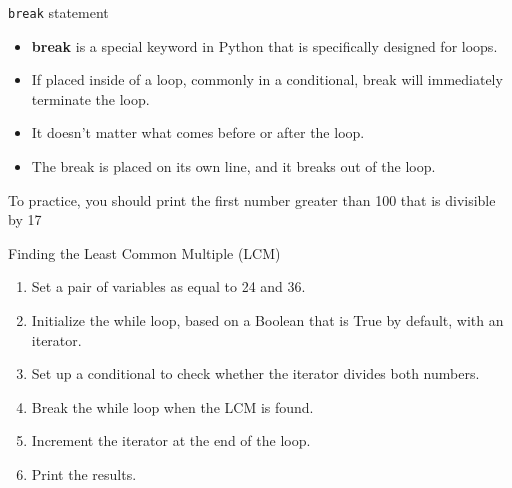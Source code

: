 \documentclass[../main.tex]{subfiles}
\begin{document}
\begin{frame}[fragile]{\texttt{break} statement}
  \begin{itemize} \justifying
  \item \textbf{break} is a special keyword in Python that is specifically designed for loops. 
  \item If placed inside of a loop, commonly in a conditional, break will immediately terminate the loop. 
  \item It doesn't matter what comes before or after the loop. 
  \item The break is placed on its own line, and it breaks out of the loop.
  \end{itemize}

  To practice, you should print the first number greater than 100 that is divisible by 17
\end{frame}

\begin{frameact}{Finding the Least Common Multiple (LCM)}
  \begin{enumerate}\parskip3mm  \justifying
  \item Set a pair of variables as equal to 24 and 36.
  \item Initialize the while loop, based on a Boolean that is True by default, with an iterator.
  \item Set up a conditional to check whether the iterator divides both numbers.
  \item Break the while loop when the LCM is found.
  \item Increment the iterator at the end of the loop.
  \item  Print the results.
  \end{enumerate}
\end{frameact}
\end{document}
